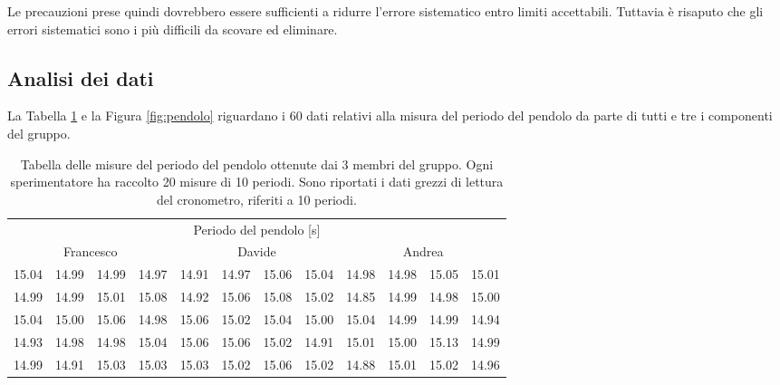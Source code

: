 Le precauzioni prese quindi dovrebbero essere sufficienti a ridurre l'errore sistematico
entro limiti accettabili. Tuttavia è risaputo che gli errori sistematici
sono i più difficili da scovare ed eliminare.

\subsection{Analisi dei dati}

La Tabella \ref{tab:pendolo} e la Figura \ref{fig:pendolo} riguardano i 60 dati
relativi alla misura del periodo del pendolo da parte di tutti e tre i
componenti del gruppo.

\begin{table}[h]
	\begin{tabular} {c c c c | c c c c | c c c c}
		\toprule
		\multicolumn{12}{c}{Periodo del pendolo [s]} \\
		\multicolumn{4}{c}{Francesco} & \multicolumn{4}{c}{Davide} & \multicolumn{4}{c}{Andrea} \\
		\midrule
		15.04 & 14.99 & 14.99 & 14.97 & 14.91 & 14.97 & 15.06 & 15.04 & 14.98 & 14.98 & 15.05 & 15.01 \\
		14.99 & 14.99 & 15.01 & 15.08 & 14.92 & 15.06 & 15.08 & 15.02 & 14.85 & 14.99 & 14.98 & 15.00 \\
		15.04 & 15.00 & 15.06 & 14.98 & 15.06 & 15.02 & 15.04 & 15.00 & 15.04 & 14.99 & 14.99 & 14.94 \\
		14.93 & 14.98 & 14.98 & 15.04 & 15.06 & 15.06 & 15.02 & 14.91 & 15.01 & 15.00 & 15.13 & 14.99 \\
		14.99 & 14.91 & 15.03 & 15.03 & 15.03 & 15.02 & 15.06 & 15.02 & 14.88 & 15.01 & 15.02 & 14.96 \\
		\bottomrule
	\end{tabular}

	\caption{Tabella delle misure del periodo del pendolo ottenute dai 3 membri del gruppo.
        Ogni sperimentatore ha raccolto 20 misure di 10 periodi. Sono riportati
        i dati grezzi di lettura del cronometro, riferiti a 10 periodi. }
    \label{tab:pendolo}
\end{table}



